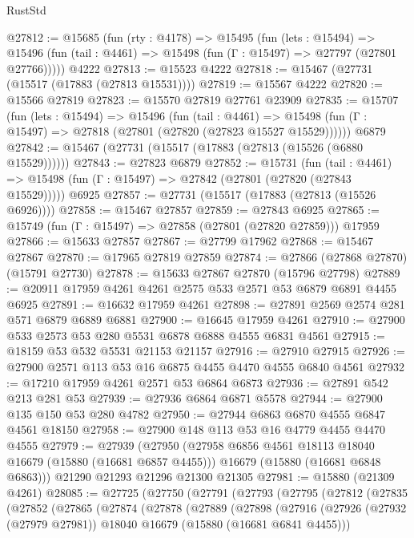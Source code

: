\begin{lexlean}{RustStd}
\begin{coremodule}
@27812 := @15685
    (fun (rty : @4178) =>
    @15495
      (fun (lets : @15494) =>
      @15496 (fun (tail : @4461) => @15498 (fun (Γ : @15497) => @27797 (@27801 @27766)))))
    @4222
@27813 := @15523 @4222
@27818 := @15467 (@27731 (@15517 (@17883 (@27813 @15531))))
@27819 := @15567 @4222
@27820 := @15566 @27819
@27823 := @15570 @27819 @27761 @23909
@27835 := @15707
    (fun (lets : @15494) =>
    @15496
      (fun (tail : @4461) =>
      @15498 (fun (Γ : @15497) => @27818 (@27801 (@27820 (@27823 @15527 @15529))))))
    @6879
@27842 := @15467 (@27731 (@15517 (@17883 (@27813 (@15526 (@6880 @15529))))))
@27843 := @27823 @6879
@27852 := @15731
    (fun (tail : @4461) => @15498 (fun (Γ : @15497) => @27842 (@27801 (@27820 (@27843 @15529)))))
    @6925
@27857 := @27731 (@15517 (@17883 (@27813 (@15526 @6926))))
@27858 := @15467 @27857
@27859 := @27843 @6925
@27865 := @15749 (fun (Γ : @15497) => @27858 (@27801 (@27820 @27859))) @17959
@27866 := @15633 @27857
@27867 := @27799 @17962
@27868 := @15467 @27867
@27870 := @17965 @27819 @27859
@27874 := @27866 (@27868 @27870) (@15791 @27730)
@27878 := @15633 @27867 @27870 (@15796 @27798)
@27889 := @20911 @17959 @4261 @4261 @2575 @533 @2571 @53 @6879 @6891 @4455 @6925
@27891 := @16632 @17959 @4261
@27898 := @27891 @2569 @2574 @281 @571 @6879 @6889 @6881
@27900 := @16645 @17959 @4261
@27910 := @27900 @533 @2573 @53 @280 @5531 @6878 @6888 @4555 @6831 @4561
@27915 := @18159 @53 @532 @5531 @21153 @21157
@27916 := @27910 @27915
@27926 := @27900 @2571 @113 @53 @16 @6875 @4455 @4470 @4555 @6840 @4561
@27932 := @17210 @17959 @4261 @2571 @53 @6864 @6873
@27936 := @27891 @542 @213 @281 @53
@27939 := @27936 @6864 @6871 @5578
@27944 := @27900 @135 @150 @53 @280 @4782
@27950 := @27944 @6863 @6870 @4555 @6847 @4561 @18150
@27958 := @27900 @148 @113 @53 @16 @4779 @4455 @4470 @4555
@27979 := @27939
    (@27950
      (@27958 @6856 @4561 @18113 @18040 @16679 (@15880 (@16681 @6857 @4455)))
      @16679
      (@15880 (@16681 @6848 @6863)))
    @21290
    @21293
    @21296
    @21300
    @21305
@27981 := @15880 (@21309 @4261)
@28085 := @27725
    (@27750
      (@27791
        (@27793
          (@27795
            (@27812
              (@27835
                (@27852
                  (@27865
                    (@27874
                      (@27878
                        (@27889
                          (@27898
                            (@27916
                              (@27926
                                (@27932 (@27979 @27981))
                                @18040
                                @16679
                                (@15880 (@16681 @6841 @4455)))

\end{coremodule}
\end{lexlean}
